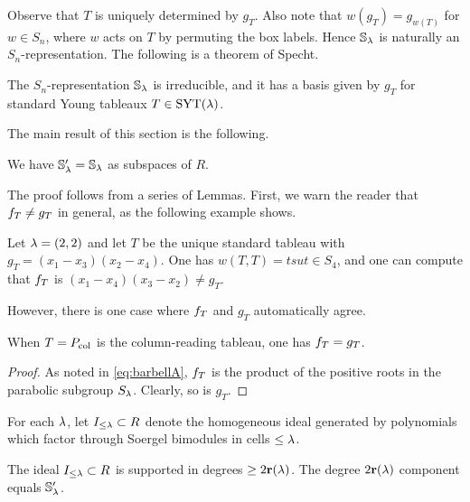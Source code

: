 Observe that $T$ is uniquely determined by $g_T$. Also note that $w(g_T) = g_{w(T)}$ for $w \in S_n$, where $w$ acts on $T$ by permuting the box labels. Hence ${\mathbb{S}}_\lambda$ is naturally an $S_n$-representation. The following is a theorem of Specht.

\begin{thm} The $S_n$-representation ${\mathbb{S}}_\lambda$ is irreducible, and it has a basis given by $g_T$ for standard Young tableaux $T \in \operatorname{SYT}(\lambda)$. \end{thm}

The main result of this section is the following.

\begin{thm}\label{thm:specht}
We have ${\mathbb{S}}_\lambda'={\mathbb{S}}_\lambda$ as subspaces of $R$.
\end{thm}

The proof follows from a series of Lemmas.  First, we warn the reader that $f_{T}\neq g_T$ in general, as the following example shows.

\begin{ex} \label{ex:fPnotgP} Let $\lambda = (2,2)$ and let $T$ be the unique standard tableau with $g_T=(x_1-x_3)(x_2-x_4)$. One has $w(T,T) = tsut \in S_4$, and one can compute that $f_{T}$ is $(x_1-x_4)(x_3 - x_2)\neq g_T$. \end{ex}
	
However, there is one case where $f_{T}$ and $g_T$ automatically agree.

\begin{lemma} When $T = P_{\operatorname{col}}$ is the column-reading tableau, one has $f_{T} = g_T$. \end{lemma}
	
\begin{proof} As noted in \eqref{eq:barbellA}, $f_{T}$ is the product of the positive roots in the parabolic subgroup $S_\lambda$. Clearly, so is $g_T$. \end{proof}

For each $\lambda$, let $I_{\leq\lambda}\subset R$ denote the homogeneous ideal generated by polynomials which factor through Soergel bimodules in cells $\le \lambda$.

\begin{lemma}\label{lemma:specht1}
The ideal $I_{\leq\lambda}\subset R$ is supported in degrees $\geq 2\mathbf{r}(\lambda)$.  The degree $2\mathbf{r}(\lambda)$ component equals ${\mathbb{S}}_\lambda'$.
\end{lemma}

